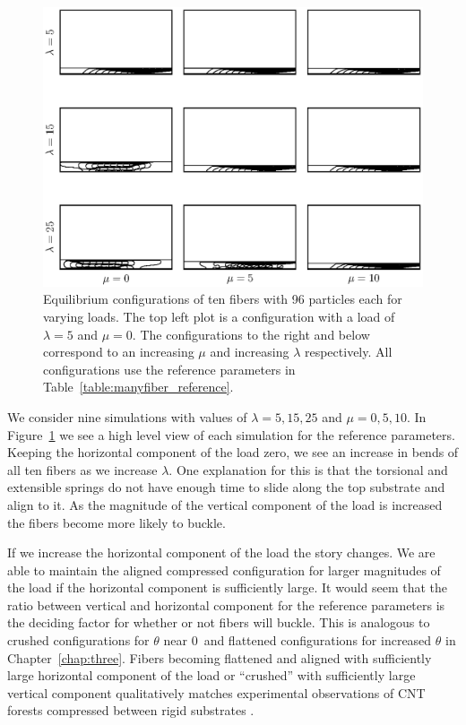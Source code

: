 	\begin{figure}
		\begin{center}
			\includegraphics[scale=1]{./fig/ch4/grid.eps}
		\end{center}		
		\caption{Equilibrium configurations of ten fibers with 96 particles each for varying loads. The top left plot is a configuration with a load of $\lambda = 5$ and $\mu = 0$. The configurations to the right and below correspond to an increasing $\mu$ and increasing $\lambda$ respectively. All configurations use the reference parameters in Table~\ref{table:manyfiber_reference}.
		\label{fig:grid}}
	\end{figure}
	
	We consider nine simulations with values of $\lambda = 5, 15, 25$ and $\mu = 0, 5, 10$. In Figure~\ref{fig:grid} we see a high level view of each simulation for the reference parameters. Keeping the horizontal component of the load zero, we see an increase in bends of all ten fibers as we increase $\lambda$. One explanation for this is that the torsional and extensible springs do not have enough time to slide along the top substrate and align to it. As the magnitude of the vertical component of the load is increased the fibers become more likely to buckle. 
	
	If we increase the horizontal component of the load the story changes. We are able to maintain the aligned compressed configuration for larger magnitudes of the load if the horizontal component is sufficiently large. It would seem that the ratio between vertical and horizontal component for the reference parameters is the deciding factor for whether or not fibers will buckle. This is analogous to crushed configurations for $\theta$ near $0$\textdegree\ and flattened configurations for increased $\theta$ in Chapter~\ref{chap:three}. Fibers becoming flattened and aligned with sufficiently large horizontal component of the load or ``crushed'' with sufficiently large vertical component qualitatively matches experimental observations of CNT forests compressed between rigid substrates \cite{Qu2008}.


